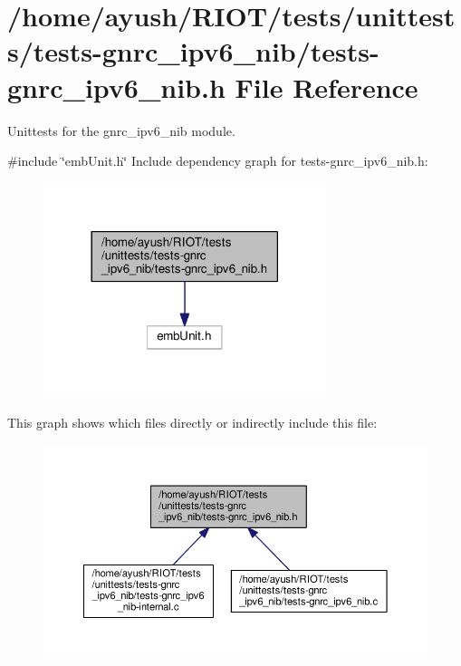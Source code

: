 \hypertarget{tests-gnrc__ipv6__nib_8h}{}\section{/home/ayush/\+R\+I\+O\+T/tests/unittests/tests-\/gnrc\+\_\+ipv6\+\_\+nib/tests-\/gnrc\+\_\+ipv6\+\_\+nib.h File Reference}
\label{tests-gnrc__ipv6__nib_8h}


Unittests for the {\ttfamily gnrc\+\_\+ipv6\+\_\+nib} module.  


{\ttfamily \#include \char`\"{}emb\+Unit.\+h\char`\"{}}\newline
Include dependency graph for tests-\/gnrc\+\_\+ipv6\+\_\+nib.h\+:
\nopagebreak
\begin{figure}[H]
\begin{center}
\leavevmode
\includegraphics[width=234pt]{tests-gnrc__ipv6__nib_8h__incl}
\end{center}
\end{figure}
This graph shows which files directly or indirectly include this file\+:
\nopagebreak
\begin{figure}[H]
\begin{center}
\leavevmode
\includegraphics[width=350pt]{tests-gnrc__ipv6__nib_8h__dep__incl}
\end{center}
\end{figure}
